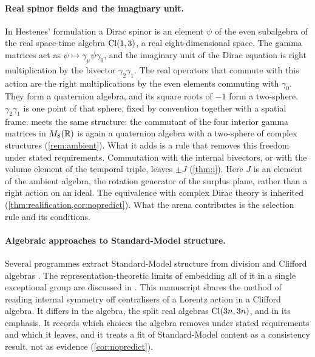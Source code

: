 \paragraph{Real spinor fields and the imaginary unit.} In Hestenes' formulation \cite{Hestenes67} a Dirac spinor is an element $\psi$ of the
even subalgebra of the real space-time algebra $\mathrm{Cl}(1,3)$, a real eight-dimensional space. The gamma matrices act as
$\psi\mapsto\gamma_\mu\psi\gamma_0$, and the imaginary unit of the Dirac equation is right multiplication by the bivector $\gamma_2\gamma_1$.
The real operators that commute with this action are the right multiplications by the even elements commuting with $\gamma_0$. They form a
quaternion algebra, and its square roots of $-1$ form a two-sphere. $\gamma_2\gamma_1$ is one point of that sphere, fixed by convention
together with a spatial frame.  meets the same structure: the commutant of the four interior gamma matrices in
$M_8(\mathbb{R})$ is again a quaternion algebra with a two-sphere of complex structures (\cref{rem:ambient}). What it adds is a rule that removes
this freedom under stated requirements. Commutation with the internal bivectors, or with the volume element of the temporal triple, leaves
$\pm J$ (\cref{thm:i}). Here $J$ is an element of the ambient algebra, the rotation generator of the surplus plane, rather than a right
action on an ideal. The equivalence with complex Dirac theory is inherited (\cref{thm:realification,cor:nopredict}). What the arena
contributes is the selection rule and its conditions.

\paragraph{Algebraic approaches to Standard-Model structure.} Several programmes extract Standard-Model structure from division and Clifford
algebras \cite{Furey,Gresnigt}. The representation-theoretic limits of embedding all of it in a single exceptional group are discussed in
\cite{DistlerGaribaldi}. This manuscript shares the method of reading internal symmetry off centralisers of a Lorentz action in a Clifford
algebra. It differs in the algebra, the split real algebras $\mathrm{Cl}(3n,3n)$, and in its emphasis. It records which choices the algebra removes
under stated requirements and which it leaves, and it treats a fit of Standard-Model content as a consistency result, not as evidence
(\cref{cor:nopredict}).

